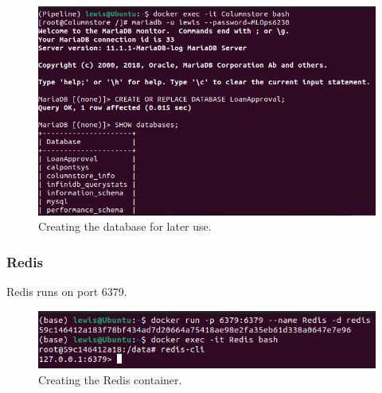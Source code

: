 \documentclass[12pt]{report}
\begin{document}
\begin{figure}[H]
    \centering
    \includegraphics[width=\linewidth]{Implementation/Docker/Containers/MariaDB/3.png}
    \caption{Creating the database for later use.}
    \label{fig:CreateDB}
\end{figure}

\subsubsection{Redis}
Redis runs on port 6379.

\begin{figure}[H]
    \centering
    \includegraphics[width=\linewidth]{Implementation/Docker/Containers/Redis/1.png}
    \caption{Creating the Redis container.}
    \label{fig:CreateRedis}
\end{figure}




\end{document}
